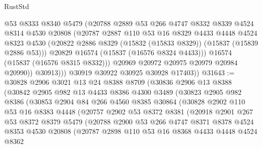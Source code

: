 \begin{lexlean}{RustStd}
\begin{coremodule}
{\begin{coremodule}
{{{{{{{{{{{{{{{{{{{{{{{{{{{{{{{{{{{{{{{{{{{{{{{{{{{{{{{{{{{{                  @53
                  @8333
                  @8340
                  @5479
                  (@20788
                    @2889
                    @53
                    @266
                    @4747
                    @8332
                    @8339
                    @4524
                    @8314
                    @4530
                    @20808
                    (@20787
                      @2887
                      @110
                      @53
                      @16
                      @8329
                      @4433
                      @4448
                      @4524
                      @8323
                      @4530
                      (@20822 @2886 @8329 (@15832 (@15833 @8329)) (@15837 (@15839 @2886 @53)))
                      @20829
                      @16574
                      (@15837 (@16576 @8324 @4433)))
                    @16574
                    (@15837 (@16576 @8315 @8332)))
                  @20969
                  @20972
                  @20975
                  @20979
                  @20984
                  @20990))
              @30913)))
        @30919
        @30922
        @30925
        @30928
        @17403))
@31643 := @30828
    @2906
    @3021
    @13
    @24
    @8388
    @8709
    (@30836
      @2906
      @13
      @8388
      (@30842
        @2905
        @982
        @13
        @4433
        @8386
        @4300
        @3489
        (@30823
          @2905
          @982
          @8386
          (@30853
            @2904
            @84
            @266
            @4560
            @8385
            @30864
            (@30828
              @2902
              @110
              @53
              @16
              @8383
              @4448
              (@20757
                @2902
                @53
                @8372
                @8381
                (@20918
                  @2901
                  @267
                  @53
                  @8372
                  @8379
                  @5479
                  (@20788
                    @2900
                    @53
                    @266
                    @4747
                    @8371
                    @8378
                    @4524
                    @8353
                    @4530
                    @20808
                    (@20787
                      @2898
                      @110
                      @53
                      @16
                      @8368
                      @4433
                      @4448
                      @4524
                      @8362
}}}}}}}}}}}}}}}}}}}}}}}}}}}}}}}}}}}}}}}}}}}}}}}}}}}}}}}}}}}}
\end{coremodule}}
\end{coremodule}
\end{lexlean}
